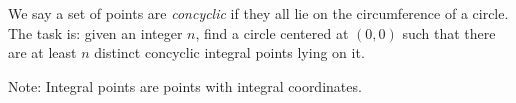 We say a set of points are \emph{concyclic} if they all lie on 
the circumference of a circle.
The task is: given an integer $n$, find a circle centered at $(0,0)$ 
such that there are at least $n$ distinct concyclic integral points lying on it.

Note: Integral points are points with integral coordinates.
